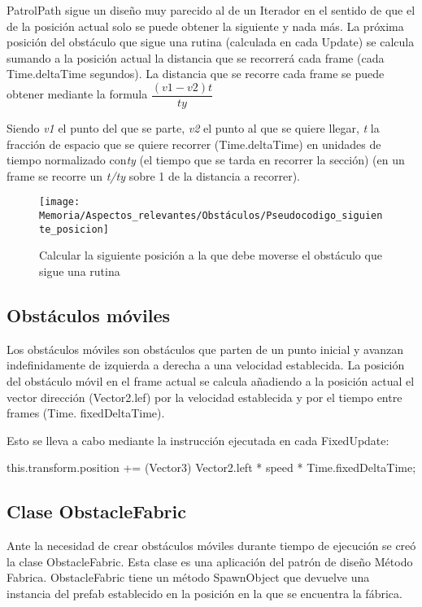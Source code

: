 PatrolPath sigue un diseño muy parecido al de un Iterador en el sentido de que el de la posición actual solo se puede obtener la siguiente y nada más.
La próxima posición del obstáculo que sigue una rutina (calculada en cada Update) se calcula sumando a la posición actual la distancia que se recorrerá cada frame (cada Time.deltaTime segundos).
La distancia que se recorre cada frame se puede obtener mediante la formula $\dfrac{(v1-v2)t}{ty}$

Siendo \textit{v1} el punto del que se parte, \textit{v2} el punto al que se quiere llegar, \textit{t} la fracción de espacio que se quiere recorrer (Time.deltaTime) en unidades de tiempo normalizado con\textit{ty} (el tiempo que se tarda en recorrer la sección) (en un frame se recorre un \textit{t/ty} sobre 1 de la distancia a recorrer).

\clearpage
\begin{figure}[h]
\centering
\texttt{[image: Memoria/Aspectos\_relevantes/Obstáculos/Pseudocodigo\_siguiente\_posicion]}
\caption{Calcular la siguiente posición a la que debe moverse el obstáculo que sigue una rutina}
\end{figure}

\subsection{Obstáculos móviles}
Los obstáculos móviles son obstáculos que parten de un punto inicial y avanzan indefinidamente de izquierda a derecha a una velocidad establecida. La posición del obstáculo móvil en el frame actual se calcula añadiendo a la posición actual el vector dirección (Vector2.lef) por la velocidad establecida y por el tiempo entre frames (Time. fixedDeltaTime).

Esto se lleva a cabo mediante la instrucción ejecutada en cada FixedUpdate:

this.transform.position += (Vector3) Vector2.left * speed * Time.fixedDeltaTime;

\subsection{Clase ObstacleFabric}
Ante la necesidad de crear obstáculos móviles durante tiempo de ejecución se creó la clase ObstacleFabric. Esta clase es una aplicación del patrón de diseño Método Fabrica. ObstacleFabric tiene un método SpawnObject que devuelve una instancia del prefab establecido en la posición en la que se encuentra la fábrica.

